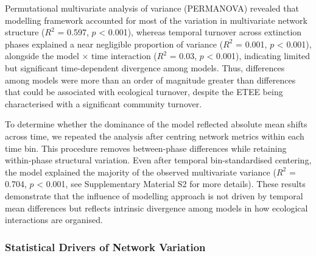\documentclass[
]{article}
\begin{document}
Permutational multivariate analysis of variance (PERMANOVA) revealed
that modelling framework accounted for most of the variation in
multivariate network structure (\(R^2\) = 0.597, \(p\) \textless{}
0.001), whereas temporal turnover across extinction phases explained a
near negligible proportion of variance (\(R^2\) = 0.001, \(p\)
\textless{} 0.001), alongside the model \(\times\) time interaction
(\(R^2\) = 0.03, \(p\) \textless{} 0.001), indicating limited but
significant time-dependent divergence among models. Thus, differences
among models were more than an order of magnitude greater than
differences that could be associated with ecological turnover, despite
the ETEE being characterised with a significant community turnover.

To determine whether the dominance of the model reflected absolute mean
shifts across time, we repeated the analysis after centring network
metrics within each time bin. This procedure removes between-phase
differences while retaining within-phase structural variation. Even
after temporal bin-standardised centering, the model explained the
majority of the observed multivariate variance (\(R^2\) = 0.704, \(p\)
\textless{} 0.001, see Supplementary Material S2 for more details).
These results demonstrate that the influence of modelling approach is
not driven by temporal mean differences but reflects intrinsic
divergence among models in how ecological interactions are organised.

\subsubsection{Statistical Drivers of Network
Variation}\label{statistical-drivers-of-network-variation}
\end{document}

